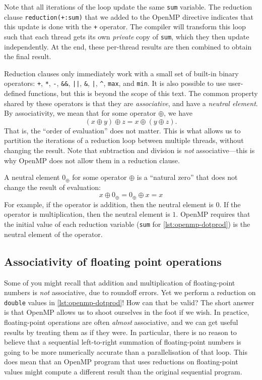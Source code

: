 Note that all iterations of the loop update the same \texttt{sum}
variable.  The reduction clause \texttt{reduction(+:sum)} that we
added to the OpenMP directive indicates that this update is done with
the \lstinline{+} operator.  The compiler will transform this loop
such that each thread gets its own \emph{private} copy of
\texttt{sum}, which they then update independently.  At the end, these
per-thread results are then combined to obtain the final result.

Reduction clauses only immediately work with a small set of built-in
binary operators: \lstinline{+}, \lstinline{*}, \lstinline{-},
\lstinline{&&}, \lstinline{||}, \lstinline{&}, \lstinline{|},
\lstinline{^}, \lstinline{max}, and \lstinline{min}.  It is also
possible to use user-defined functions, but this is beyond the scope
of this text.  The common property shared by these operators is that
they are \emph{associative}, and have a \emph{neutral element}.  By
associativity, we mean that for some operator $\oplus$, we have
\[
  (x \oplus y) \oplus z = x \oplus (y \oplus z).
\]
That is, the ``order of evaluation'' does not matter.  This is what
allows us to partition the iterations of a reduction loop between
multiple threads, without changing the result.  Note that subtraction
and division is \emph{not} associative---this is why OpenMP does not
allow them in a reduction clause.

A neutral element $0_{\oplus}$ for some operator $\oplus$ is a
``natural zero'' that does not change the result of evaluation:
\[
  x \oplus 0_{\oplus} = 0_{\oplus} \oplus x = x
\]
For example, if the operator is addition, then the neutral element is
$0$.  If the operator is multiplication, then the neutral element is
$1$.  OpenMP requires that the initial value of each reduction
variable (\lstinline{sum} for \cref{lst:openmp-dotprod}) is the
neutral element of the operator.

\subsection{Associativity of floating point operations}

Some of you might recall that addition and multiplication of
floating-point numbers is \emph{not} associative, due to roundoff
errors.  Yet we perform a reduction on \lstinline{double} values in
\cref{lst:openmp-dotprod}!  How can that be valid?  The short answer
is that OpenMP allows us to shoot ourselves in the foot if we wish.
In practice, floating-point operations are often \emph{almost}
associative, and we can get useful results by treating them as if they
were.  In particular, there is no reason to believe that a sequential
left-to-right summation of floating-point numbers is going to be more
numerically accurate than a parallelisation of that loop.  This does
mean that an OpenMP program that uses reductions on floating-point
values might compute a different result than the original sequential
program.

